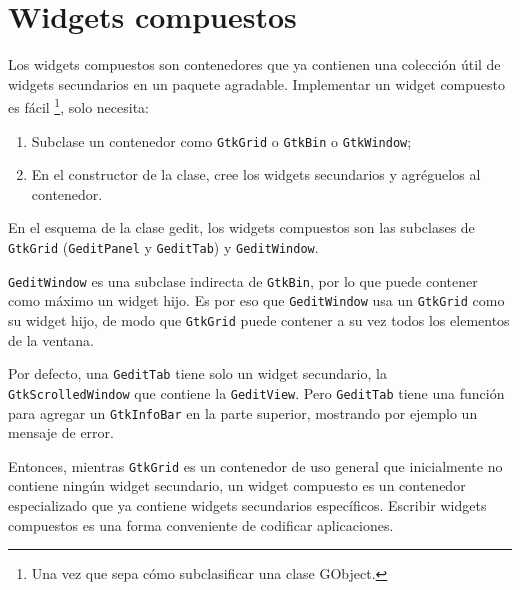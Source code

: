 \section{Widgets compuestos}

Los widgets compuestos son contenedores que ya contienen una colección útil de widgets secundarios en un paquete agradable. Implementar un widget compuesto es fácil \footnote{Una vez que sepa cómo subclasificar una clase GObject.}, solo necesita:
\begin{enumerate}
  \item Subclase un contenedor como \lstinline{GtkGrid} o \lstinline{GtkBin} o \lstinline{GtkWindow};
  \item En el constructor de la clase, cree los widgets secundarios y agréguelos al contenedor.
\end{enumerate}

En el esquema de la clase gedit, los widgets compuestos son las subclases de \lstinline{GtkGrid} (\lstinline{GeditPanel} y \lstinline{GeditTab}) y \lstinline{GeditWindow}.

\lstinline{GeditWindow} es una subclase indirecta de \lstinline{GtkBin}, por lo que puede contener como máximo un widget hijo. Es por eso que \lstinline{GeditWindow} usa un \lstinline{GtkGrid} como su widget hijo, de modo que \lstinline{GtkGrid} puede contener a su vez todos los elementos de la ventana.

Por defecto, una \lstinline{GeditTab} tiene solo un widget secundario, la \lstinline{GtkScrolledWindow} que contiene la \lstinline{GeditView}. Pero \lstinline{GeditTab} tiene una función para agregar un \lstinline{GtkInfoBar} en la parte superior, mostrando por ejemplo un mensaje de error.

Entonces, mientras \lstinline{GtkGrid} es un contenedor de uso general que inicialmente no contiene ningún widget secundario, un widget compuesto es un contenedor especializado que ya contiene widgets secundarios específicos. Escribir widgets compuestos es una forma conveniente de codificar aplicaciones.

